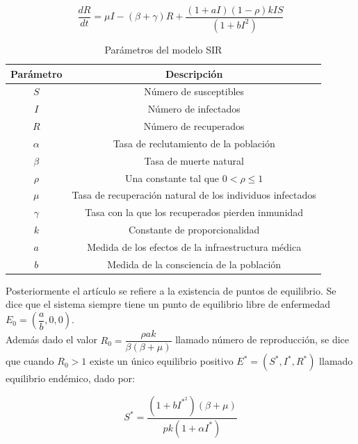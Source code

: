 \documentclass{article}
\begin{document}
\begin{equation}
    \dfrac{dR}{dt}= \mu I - (\beta + \gamma)R + \dfrac{(1+aI)(1-\rho)kIS}{(1+bI^2)}
\end{equation}

\begin{table}[h]
    \centering
    \begin{tabular}{|c|c|}
        \hline
        \textbf{Parámetro} & \textbf{Descripción} \\ \hline
        $S$ & Número de susceptibles \\ \hline
        $I$ & Número de infectados \\ \hline
        $R$ & Número de recuperados \\ \hline
        $\alpha$ & Tasa de reclutamiento de la poblaci\'on \\ \hline
        $\beta$ & Tasa de muerte natural \\ \hline
        $\rho$ & Una constante tal que $0 < \rho \leq 1$ \\ \hline
        $\mu$ & Tasa de recuperaci\'on natural de los individuos infectados \\ \hline
        $\gamma$ & Tasa con la que los recuperados pierden inmunidad \\ \hline
        $k$ & Constante de proporcionalidad \\ \hline
        $a$ & Medida de los efectos de la infraestructura m\'edica \\ \hline
        $b$ & Medida de la consciencia de la poblaci\'on \\ \hline
    \end{tabular}
    \caption{Parámetros del modelo SIR}
    \label{tab:my_label}
\end{table}

Posteriormente el art\'iculo se refiere a la existencia de puntos de equilibrio. Se dice que el sistema siempre tiene un punto de equilibrio libre de enfermedad $E_0 = \left(\dfrac{a}{b}, 0, 0\right)$. \\
Adem\'as dado el valor $R_0 = \dfrac{\rho ak}{\beta (\beta + \mu)}$ llamado n\'umero de reproducci\'on, se dice que cuando $R_0 > 1$ existe un \'unico equilibrio positivo $E^*=(S^*, I^*, R^*)$ llamado equilibrio end\'emico, dado por:

\begin{equation}
    S^* = \dfrac{(1 + bI^{{*}^2})(\beta + \mu)}{pk(1+\alpha I^*)}
\end{equation}
\end{document}
